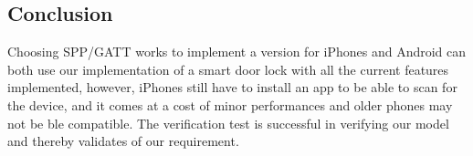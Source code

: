 \subsection{Conclusion}
Choosing SPP/GATT works to implement a version for iPhones and Android can both use our implementation of a smart door lock with all the current features implemented, however, iPhones still have to install an app to be able to scan for the device, and it comes at a cost of minor performances and older phones may not be \gls{ble} compatible. The verification test is successful in verifying our model and thereby validates of our requirement.
